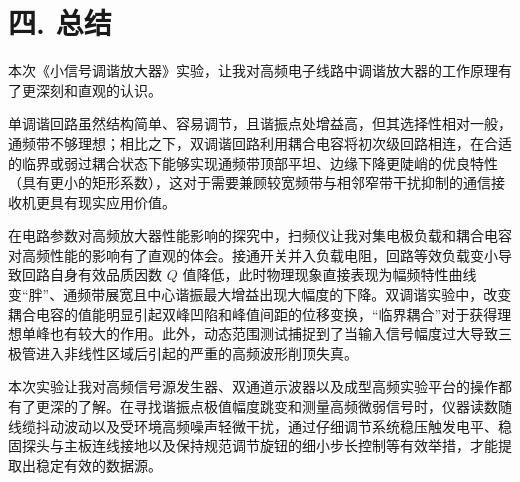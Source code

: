 \documentclass[12pt]{article}
\begin{document}
\section*{四. 总结}

本次《小信号调谐放大器》实验，让我对高频电子线路中调谐放大器的工作原理有了更深刻和直观的认识。

单调谐回路虽然结构简单、容易调节，且谐振点处增益高，但其选择性相对一般，通频带不够理想；相比之下，双调谐回路利用耦合电容将初次级回路相连，在合适的临界或弱过耦合状态下能够实现通频带顶部平坦、边缘下降更陡峭的优良特性（具有更小的矩形系数），这对于需要兼顾较宽频带与相邻窄带干扰抑制的通信接收机更具有现实应用价值。

在电路参数对高频放大器性能影响的探究中，扫频仪让我对集电极负载和耦合电容对高频性能的影响有了直观的体会。接通开关并入负载电阻，回路等效负载变小导致回路自身有效品质因数 $Q$ 值降低，此时物理现象直接表现为幅频特性曲线变“胖”、通频带展宽且中心谐振最大增益出现大幅度的下降。双调谐实验中，改变耦合电容的值能明显引起双峰凹陷和峰值间距的位移变换，“临界耦合”对于获得理想单峰也有较大的作用。此外，动态范围测试捕捉到了当输入信号幅度过大导致三极管进入非线性区域后引起的严重的高频波形削顶失真。

本次实验让我对高频信号源发生器、双通道示波器以及成型高频实验平台的操作都有了更深的了解。在寻找谐振点极值幅度跳变和测量高频微弱信号时，仪器读数随线缆抖动波动以及受环境高频噪声轻微干扰，通过仔细调节系统稳压触发电平、稳固探头与主板连线接地以及保持规范调节旋钮的细小步长控制等有效举措，才能提取出稳定有效的数据源。
\end{document}
